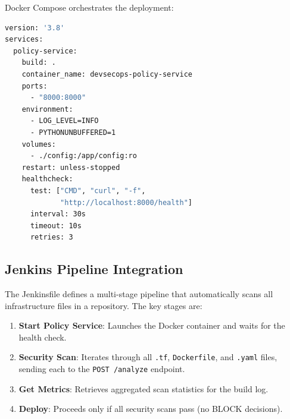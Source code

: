 Docker Compose orchestrates the deployment:

\begin{lstlisting}[language=bash, caption={docker-compose.yml — single-command deployment}, label={lst:docker-compose}]
version: '3.8'
services:
  policy-service:
    build: .
    container_name: devsecops-policy-service
    ports:
      - "8000:8000"
    environment:
      - LOG_LEVEL=INFO
      - PYTHONUNBUFFERED=1
    volumes:
      - ./config:/app/config:ro
    restart: unless-stopped
    healthcheck:
      test: ["CMD", "curl", "-f", 
             "http://localhost:8000/health"]
      interval: 30s
      timeout: 10s
      retries: 3
\end{lstlisting}

\subsection{Jenkins Pipeline Integration}

The Jenkinsfile defines a multi-stage pipeline that automatically scans all infrastructure files in a repository. The key stages are:

\begin{enumerate}
    \item \textbf{Start Policy Service}: Launches the Docker container and waits for the health check.
    \item \textbf{Security Scan}: Iterates through all \texttt{.tf}, \texttt{Dockerfile}, and \texttt{.yaml} files, sending each to the \texttt{POST /analyze} endpoint.
    \item \textbf{Get Metrics}: Retrieves aggregated scan statistics for the build log.
    \item \textbf{Deploy}: Proceeds only if all security scans pass (no BLOCK decisions).
\end{enumerate}

